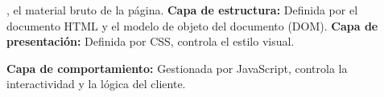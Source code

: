 
, el material bruto de la página. \textbf{Capa de estructura:
} Definida por el documento HTML y el modelo de objeto del documento (DOM). \textbf{Capa de presentación:} Definida por CSS, controla el estilo visual.

\textbf{Capa de comportamiento:} Gestionada por JavaScript, controla la interactividad y la lógica del cliente.

